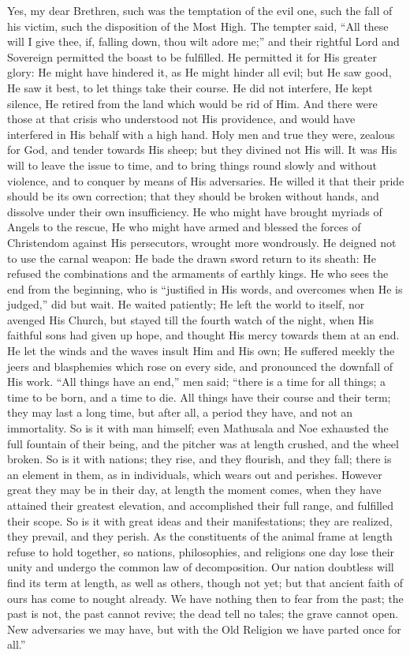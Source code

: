 Yes, my dear Brethren, such was the temptation of the
evil one, such the fall of his victim, such the
disposition of the Most High. The tempter said, ``All
these will I give thee, if, falling down, thou wilt adore
me;'' and their rightful Lord and Sovereign permitted
the boast to be fulfilled. He permitted it for His
greater glory: He might have hindered it, as He might
hinder all evil; but He saw good, He saw it best, to let
things take their course. He did not interfere, He kept
silence, He retired from the land which would be rid of
Him. And there were those at that crisis who understood
not His providence, and would have interfered in His
behalf with a high hand. Holy men and true they were,
zealous for God, and tender towards His sheep; but they
divined not His will. It was His will to leave the issue
to time, and to bring things round slowly and without
violence, and to conquer by means of His adversaries. He
willed it that their pride should be its own correction;
that they should be broken without hands, and dissolve
under their own insufficiency. He who might have brought myriads of Angels to the rescue, He who might have armed
and blessed the forces of Christendom against His
persecutors, wrought more wondrously. He deigned not to
use the carnal weapon: He bade the drawn sword return to
its sheath: He refused the combinations and the armaments
of earthly kings. He who sees the end from the beginning,
who is ``justified in His words, and overcomes when
He is judged,'' did but wait. He waited patiently; He
left the world to itself, nor avenged His Church, but
stayed till the fourth watch of the night, when His
faithful sons had given up hope, and thought His mercy
towards them at an end. He let the winds and the waves
insult Him and His own; He suffered meekly the jeers and
blasphemies which rose on every side, and pronounced the
downfall of His work. ``All things have an end,''
men said; ``there is a time for all things; a time to
be born, and a time to die. All things have their course
and their term; they may last a long time, but after all,
a period they have, and not an immortality. So is it with
man himself; even Mathusala and Noe exhausted the full
fountain of their being, and the pitcher was at length
crushed, and the wheel broken. So is it with nations;
they rise, and they flourish, and they fall; there is an
element in them, as in individuals, which wears out and
perishes. However great they may be in their day, at
length the moment comes, when they have attained their
greatest elevation, and accomplished their full range,
and fulfilled their scope. So is it with great ideas and
their manifestations; they are realized, they prevail,
and they perish. As the constituents of the animal frame
at length refuse to hold together, so nations,
philosophies, and religions one day lose their unity and
undergo the common law of decomposition. Our nation
doubtless will find its term at length, as well as
others, though not yet; but that ancient faith of ours
has come to nought already. We have nothing then to fear
from the past; the past is not, the past cannot revive;
the dead tell no tales; the grave cannot open. New
adversaries we may have, but with the Old Religion we
have parted once for all.''

